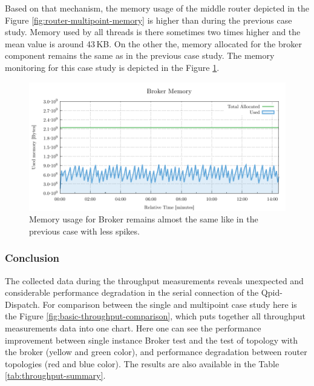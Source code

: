 Based on that mechanism, the memory usage of the middle router depicted in the Figure \ref{fig:router-multipoint-memory} is higher than during the previous case study. Memory used by all threads is there sometimes two times higher and the mean value is around 43\,KB. On the other the, memory allocated for the broker component remains the same as in the previous case study. The memory monitoring for this case study is depicted in the Figure \ref{fig:broker-multipoint-memory}.

\begin{figure}[H]
	\centering
	\includegraphics[width=1\linewidth]{obrazky-figures/charts/multipoint-router-broker-throughput-memory.pdf}
	\caption{Memory usage for Broker remains almost the same like in the previous case with less spikes.}
	\label{fig:broker-multipoint-memory}
\end{figure}


\subsubsection*{Conclusion}
The collected data during the throughput measurements reveals unexpected and considerable performance degradation in the serial connection of the Qpid-Dispatch. For comparison between the single and multipoint case study here is the Figure \ref{fig:basic-throughput-comparison}, which puts together all throughput measurements data into one chart. Here one can see the performance improvement between single instance Broker test and the test of topology with the broker (yellow and green color), and performance degradation between router topologies (red and blue color). The results are also available in the Table \ref{tab:throughput-summary}.


